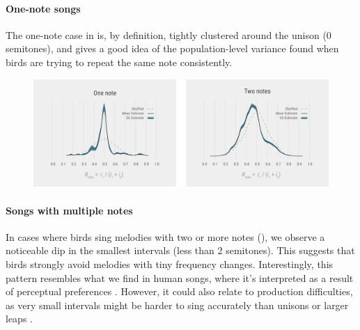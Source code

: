 \paragraph{One-note songs} 
The one-note case in  is, by definition, tightly clustered around the unison (0 semitones), and gives a good idea of the population-level variance found when birds are trying to repeat the same note consistently.

\begin{figure}[ht!]
    \centering
    \includegraphics[width=\linewidth]{figures/chapter_5/rhythmic-nulls.pdf}
    \label{c5_fig:rhythmic-nulls}
\end{figure}


\paragraph{Songs with multiple notes}
In cases where birds sing melodies with two or more notes (), we observe a noticeable dip in the smallest intervals (less than 2 semitones). This suggests that birds strongly avoid melodies with tiny frequency changes. Interestingly, this pattern resembles what we find in human songs, where it's interpreted as a result of perceptual preferences \autocite{bowling2012, kuroyanagi2019}. However, it could also relate to production difficulties, as very small intervals might be harder to sing accurately than unisons or larger leaps \autocite{anglada-tort2023}.


